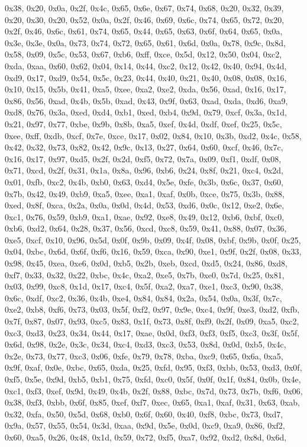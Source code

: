 \documentclass[
]{book}
\begin{document}
0x38, 0x20, 0x0a, 0x2f, 0x4c, 0x65, 0x6e, 0x67, 0x74, 0x68, 0x20, 0x32, 0x39, 0x20, 0x30, 0x20, 0x52, 0x0a, 0x2f, 0x46, 0x69, 0x6c, 0x74, 0x65, 0x72, 0x20, 0x2f, 0x46, 0x6c, 0x61, 0x74, 0x65, 0x44, 0x65, 0x63, 0x6f, 0x64, 0x65, 0x0a, 0x3e, 0x3e, 0x0a, 0x73, 0x74, 0x72, 0x65, 0x61, 0x6d, 0x0a, 0x78, 0x9c, 0x8d, 0x58, 0x09, 0x5c, 0x53, 0x67, 0xb6, 0xff, 0xce, 0x5d, 0x12, 0x50, 0x04, 0xc2, 0xda, 0xaa, 0x60, 0x62, 0x04, 0x14, 0x44, 0xc2, 0x12, 0x42, 0x40, 0x94, 0x4d, 0xd9, 0x17, 0xd9, 0x54, 0x5c, 0x23,
0x44, 0x40, 0x21, 0x40, 0x08, 0x08, 0x16, 0x10, 0x15, 0x5b, 0x41, 0xa5, 0xee, 0xa2, 0xe2, 0xda, 0x56, 0xad, 0x16, 0x17, 0x86, 0x56, 0xad, 0x4b, 0x5b, 0xad, 0x43, 0x9f, 0x63, 0xad, 0xda, 0xd6, 0xa9, 0xd8, 0x76, 0x3a, 0xed, 0xd4, 0xb1, 0xed, 0xb4, 0x9d, 0x79, 0xcf, 0x3a, 0x1d, 0x21, 0x97, 0x77, 0xbe, 0x9b, 0x8b, 0xa5, 0xef, 0x4d, 0xdf, 0xef, 0x25, 0x5c, 0xee, 0xff, 0xdb, 0xcf, 0x7e, 0xce, 0x17, 0x02, 0x84, 0x10, 0x3b, 0xd2, 0x4c, 0x58, 0x42, 0x32, 0x73, 0x82, 0x42, 0x9c, 0x13, 0x27, 0x64, 0x60, 0xcf,
0x46, 0x7c, 0x16, 0x17, 0x97, 0xd5, 0x2f, 0x2d, 0xf5, 0x72, 0x7a, 0x09, 0xf1, 0xdf, 0x08, 0x71, 0xcd, 0x2f, 0x31, 0x1a, 0x8a, 0x96, 0xb6, 0x24, 0x8f, 0x21, 0xc4, 0x2d, 0x01, 0xfb, 0xc2, 0x4b, 0xb0, 0x63, 0xd4, 0x5e, 0xfe, 0x3b, 0x6c, 0x37, 0x60, 0x7b, 0x42, 0x49, 0xb9, 0xa5, 0xee, 0xa1, 0xaf, 0x0b, 0xce, 0x75, 0x3b, 0x88, 0xed, 0x8f, 0xca, 0x2a, 0x0a, 0x0d, 0x4d, 0x53, 0xd6, 0x0c, 0x12, 0xe2, 0x6e, 0xc1, 0x76, 0x59, 0xb9, 0xa1, 0xae, 0x92, 0xe8, 0x49, 0x12, 0xb6, 0xbf, 0xc0, 0xb6, 0xd2, 0x64, 0x28,
0x37, 0x56, 0xcd, 0xc8, 0x59, 0x41, 0x88, 0x07, 0x36, 0xe5, 0xcf, 0x10, 0x96, 0x5d, 0x0f, 0x9b, 0x09, 0x4f, 0x08, 0xbf, 0x9b, 0x0f, 0x25, 0x04, 0xbc, 0x6d, 0x6f, 0xf6, 0x16, 0x59, 0xca, 0x90, 0xe1, 0x9f, 0x2f, 0x08, 0x33, 0x98, 0x45, 0xea, 0xe6, 0x0d, 0xb5, 0x2b, 0xeb, 0xcd, 0xd5, 0x24, 0x86, 0xd8, 0xf7, 0x33, 0x32, 0x22, 0xbc, 0x4c, 0xa2, 0xe5, 0x7b, 0xe0, 0x7d, 0x25, 0x81, 0x03, 0x99, 0xc8, 0x1d, 0x17, 0xc4, 0x5f, 0xa2, 0xa7, 0xe1, 0xc3, 0x90, 0x38, 0x6c, 0xdf, 0xc2, 0x36, 0x4b, 0xe4, 0x84, 0x84,
0x2a, 0x54, 0x0a, 0x3f, 0x7c, 0xe2, 0xb8, 0xf6, 0x73, 0x03, 0x5f, 0xf2, 0x97, 0x9e, 0xc4, 0x9f, 0xe3, 0xd2, 0xfb, 0x7f, 0x87, 0x07, 0x93, 0xc5, 0x83, 0x1f, 0x73, 0x8f, 0xf9, 0x2f, 0x09, 0xa5, 0xc2, 0xc3, 0xd3, 0x23, 0x34, 0x44, 0x17, 0xae, 0x0d, 0xf3, 0xf3, 0xf5, 0xc3, 0x3f, 0x5f, 0x6d, 0x98, 0x2e, 0x3c, 0x34, 0xc4, 0xd3, 0xc3, 0x53, 0x8d, 0x0d, 0xb5, 0x4c, 0x2e, 0x73, 0x77, 0xc3, 0x06, 0xfe, 0x79, 0x78, 0xba, 0xc9, 0x65, 0x6a, 0xa5, 0x9f, 0xaf, 0x0e, 0xbc, 0x65, 0xda, 0x25, 0xfd, 0x95, 0xf3, 0xbb,
0x53, 0xd3, 0x0f, 0xf5, 0x5e, 0x9d, 0xb5, 0xb1, 0x75, 0xfd, 0xc0, 0x5f, 0x0f, 0x1f, 0x84, 0x0b, 0x4e, 0xc1, 0xf3, 0xef, 0x9d, 0x49, 0x4b, 0x2f, 0x88, 0xbc, 0x7d, 0x73, 0x7b, 0xf6, 0x06, 0x38, 0xf3, 0xbb, 0x6f, 0x85, 0xef, 0xf7, 0xec, 0x65, 0xa1, 0xaf, 0x31, 0x63, 0xab, 0x32, 0xfa, 0x50, 0x5d, 0x68, 0xb0, 0x6f, 0x60, 0x40, 0xf8, 0xbc, 0x73, 0xd7, 0x9a, 0x57, 0x55, 0x54, 0x3d, 0xaa, 0x9d, 0x5e, 0x0d, 0xc9, 0xa9, 0x86, 0xf2, 0x60, 0xa5, 0x26, 0x48, 0x1d, 0x59, 0x72, 0xf5, 0xa7, 0x92, 0xd2, 0x8d, 0x6d,
\end{document}
